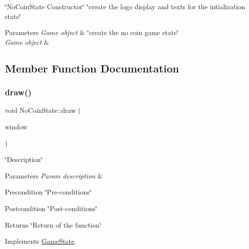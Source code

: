 \char`\"{}\+No\+Coin\+State Constructor\char`\"{}  \char`\"{}create the logo display and texts for the intialization state\char`\"{}


\begin{DoxyParams}{Parameters}
{\em Game object} & \char`\"{}create the no coin game state\char`\"{}\\
\hline
{\em Game object} & \\
\hline
\end{DoxyParams}


\subsection{Member Function Documentation}
\mbox{\label{classNoCoinState_a62c20a535a5b7af0d04d791d97834655}} 
\subsubsection{\texorpdfstring{draw()}{draw()}}
{\footnotesize\ttfamily void No\+Coin\+State\+::draw (\begin{DoxyParamCaption}\item[{sf\+::\+Render\+Window \&}]{window }\end{DoxyParamCaption})\hspace{0.3cm}{\ttfamily [virtual]}}



\char`\"{}\+Description\char`\"{} 


\begin{DoxyParams}{Parameters}
{\em Param description} & \\
\hline
\end{DoxyParams}
\begin{DoxyPrecond}{Precondition}
\char`\"{}\+Pre-\/conditions\char`\"{} 
\end{DoxyPrecond}
\begin{DoxyPostcond}{Postcondition}
\char`\"{}\+Post-\/conditions\char`\"{} 
\end{DoxyPostcond}
\begin{DoxyReturn}{Returns}
\char`\"{}\+Return of the function\char`\"{} 
\end{DoxyReturn}


Implements \hyperlink{classGameState_a3131198be0dee9ad887fc48a02d626e3}{Game\+State}.

\mbox{\label{classNoCoinState_a63f0b15e0a56b25d4a9a91a4bba35414}} 
